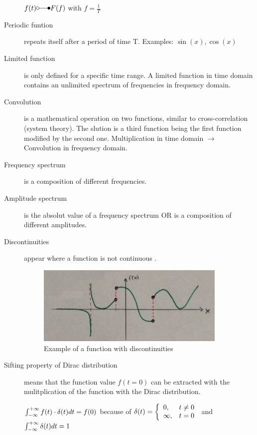 \begin{description}
	$f(t) \laplace F(f)$ with $f=\frac{1}{T}$
	
	\item[Periodic funtion] repeats itself after a period of time T. Examples: $\sin(x),\cos(x)$
	\item[Limited function] is only defined for a specific time range. A limited function in time domain contains an unlimited spectrum of frequencies in frequency domain. 
	\item[Convolution] is a mathematical operation on two functions, similar to cross-correlation (system theory). The slution is a third function being the first function modified by the second one. Multiplication in time domain $\rightarrow$ Convolution in frequency domain.
	\item[Frequency spectrum] is a composition of different frequencies.
	\item[Amplitude spectrum] is the absolut value of a frequency spectrum OR is a composition of different amplitudes.
	\item[Discontinuities] appear where a function is not continuous .
		\begin{figure}
			\centering
			\includegraphics[width=0.7\linewidth]{images_LA/discontinu}
			\caption{Example of a function with discontinuities}
			\label{fig:discontinu}
		\end{figure}
	

	\item[Sifting property of Dirac distribution] means that the function value $f(t=0)$ can be extracted with the mulitplication of the function with the Dirac distribution.
	
	
	$\int_{-\infty}^{+\infty} f(t) \cdot \delta(t) dt = f(0) $ because of 
	$ \delta(t)=\left\{\begin{array}{ll} 0,&t \neq 0 \\
	\infty,&t = 0\end{array}\right. $	and $\int_{-\infty}^{+\infty}\delta(t) dt = 1 $
	

\end{description}
